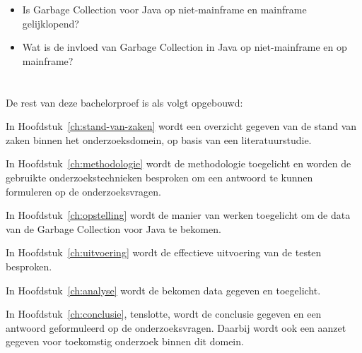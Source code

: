 \begin{itemize}
    
    \item Is Garbage Collection voor Java op niet-mainframe en mainframe gelijklopend?
    \item Wat is de invloed van Garbage Collection in Java op niet-mainframe en op mainframe?
\end{itemize}



  

\section{}%
\label{sec:onderzoeksdoelstelling}


\section{}%
\label{sec:opzet-bachelorproef}


De rest van deze bachelorproef is als volgt opgebouwd:

In Hoofdstuk~\ref{ch:stand-van-zaken} wordt een overzicht gegeven van de stand van zaken binnen het onderzoeksdomein, op basis van een literatuurstudie.

In Hoofdstuk~\ref{ch:methodologie} wordt de methodologie toegelicht en worden de gebruikte onderzoekstechnieken besproken om een antwoord te kunnen formuleren op de onderzoeksvragen.


In Hoofdstuk~\ref{ch:opstelling} wordt de manier van werken toegelicht om de data van de Garbage Collection voor Java te bekomen.

In Hoofdstuk~\ref{ch:uitvoering} wordt de effectieve uitvoering van de testen besproken.

In Hoofdstuk~\ref{ch:analyse} wordt de bekomen data gegeven en toegelicht.

In Hoofdstuk~\ref{ch:conclusie}, tenslotte, wordt de conclusie gegeven en een antwoord geformuleerd op de onderzoeksvragen. Daarbij wordt ook een aanzet gegeven voor toekomstig onderzoek binnen dit domein.